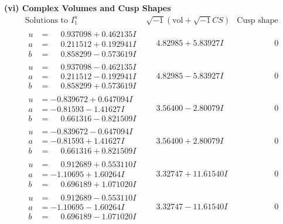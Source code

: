 \documentclass[1p]{elsarticle_modified}
\theoremstyle{definition}
\newcommand{\I}{\sqrt{-1}}
\begin{document}
\newpage\flushleft \textbf{(vi) Complex Volumes and Cusp Shapes}
$$\begin{array}{c|c|c}  
\text{Solutions to }I^u_{1}& \I (\text{vol} + \sqrt{-1}CS) & \text{Cusp shape}\\
 \hline 
\begin{aligned}
u &= \phantom{-}0.937098 + 0.462135 I \\
a &= \phantom{-}0.211512 + 0.192941 I \\
b &= \phantom{-}0.858299 - 0.573619 I\end{aligned}
 & \phantom{-}4.82985 + 5.83927 I & \phantom{-0.000000 } 0 \\ \hline\begin{aligned}
u &= \phantom{-}0.937098 - 0.462135 I \\
a &= \phantom{-}0.211512 - 0.192941 I \\
b &= \phantom{-}0.858299 + 0.573619 I\end{aligned}
 & \phantom{-}4.82985 - 5.83927 I & \phantom{-0.000000 } 0 \\ \hline\begin{aligned}
u &= -0.839672 + 0.647094 I \\
a &= -0.81593 - 1.41627 I \\
b &= \phantom{-}0.661316 - 0.821509 I\end{aligned}
 & \phantom{-}3.56400 - 2.80079 I & \phantom{-0.000000 } 0 \\ \hline\begin{aligned}
u &= -0.839672 - 0.647094 I \\
a &= -0.81593 + 1.41627 I \\
b &= \phantom{-}0.661316 + 0.821509 I\end{aligned}
 & \phantom{-}3.56400 + 2.80079 I & \phantom{-0.000000 } 0 \\ \hline\begin{aligned}
u &= \phantom{-}0.912689 + 0.553110 I \\
a &= -1.10695 + 1.60264 I \\
b &= \phantom{-}0.696189 + 1.071020 I\end{aligned}
 & \phantom{-}3.32747 + 11.61540 I & \phantom{-0.000000 } 0 \\ \hline\begin{aligned}
u &= \phantom{-}0.912689 - 0.553110 I \\
a &= -1.10695 - 1.60264 I \\
b &= \phantom{-}0.696189 - 1.071020 I\end{aligned}
 & \phantom{-}3.32747 - 11.61540 I & \phantom{-0.000000 } 0 \\ \hline\begin{aligned}

\end{aligned}
\end{array}$$
\end{document}
